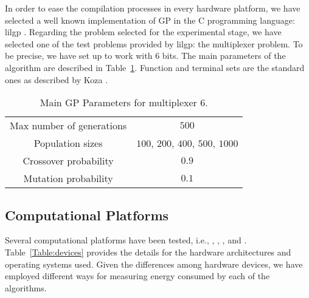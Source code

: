 In order to ease the compilation processes in every hardware platform, we have selected a well known implementation of GP in the C programming language:  lilgp \cite{lilgp}.
Regarding the problem selected for the experimental stage, we have selected one of the test problems provided by lilgp: the multiplexer problem. To be precise, we have set up to work with 6 bits. The main parameters of the algorithm are described in Table~\ref{Table:par_gp}.  Function and terminal sets are the standard ones as described by Koza \cite{koza}.



\begin{table}[!t]
\centering
\caption{Main GP Parameters for multiplexer 6.}
\label{Table:par_gp}
\begin{tabular}{cc}
\hline
Max number of generations & $500$ \\
Population sizes & $100$, $200$, $400$, $500$, $1000$ \\
Crossover probability & $0.9$ \\ 
Mutation probability & $0.1$ \\ 
\hline
\end{tabular}
\end{table}


\subsection{Computational Platforms}
\label{compplat}

Several computational platforms have been tested, i.e., \raspberrynsp, \tabletnsp, \laptopnsp, \iMac and \bladensp.  Table~\ref{Table:devices} provides the details for the hardware architectures and operating systems used. Given the differences among hardware devices, we have employed different ways  %
for measuring energy consumed by each of the algorithms.  


